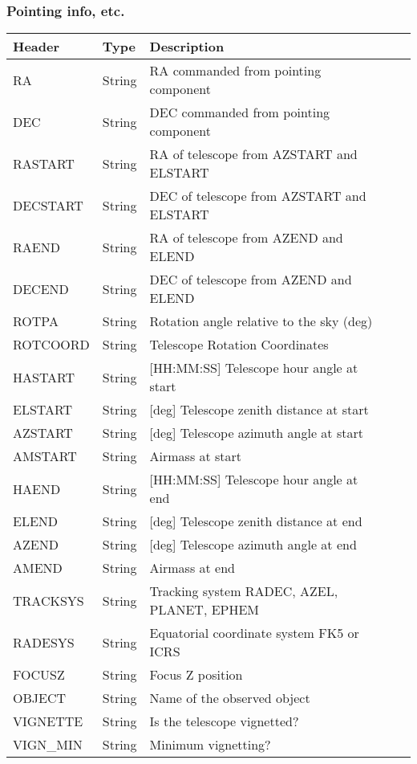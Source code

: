 \subsubsection{Pointing info, etc.}
\begin{tabular}{l l l l l}

\hline
Header & Type & Description \\
\hline
RA & String & RA commanded from pointing component \\
DEC & String & DEC commanded from pointing component \\
RASTART & String & RA of telescope from AZSTART and ELSTART \\
DECSTART & String & DEC of telescope from AZSTART and ELSTART \\
RAEND & String & RA of telescope from AZEND and ELEND \\
DECEND & String & DEC of telescope from AZEND and ELEND \\
ROTPA & String & Rotation angle relative to the sky (deg) \\
ROTCOORD & String & Telescope Rotation Coordinates \\
HASTART & String & [HH:MM:SS] Telescope hour angle at start \\
ELSTART & String & [deg] Telescope zenith distance at start \\
AZSTART & String & [deg] Telescope azimuth angle at start \\
AMSTART & String & Airmass at start \\
HAEND & String & [HH:MM:SS] Telescope hour angle at end \\
ELEND & String & [deg] Telescope zenith distance at end \\
AZEND & String & [deg] Telescope azimuth angle at end \\
AMEND & String & Airmass at end \\
TRACKSYS & String & Tracking system RADEC, AZEL, PLANET, EPHEM \\
RADESYS & String & Equatorial coordinate system FK5 or ICRS \\
FOCUSZ & String & Focus Z position \\
OBJECT & String & Name of the observed object \\
VIGNETTE & String & Is the telescope vignetted? \\
VIGN\_MIN & String & Minimum vignetting? \\
\hline
\end{tabular}


